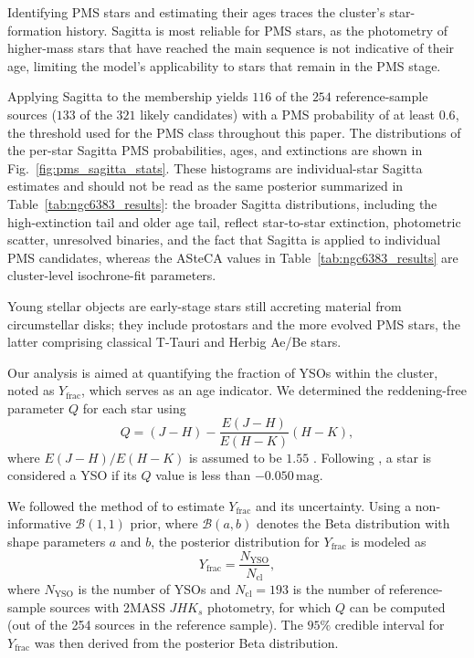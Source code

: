 \documentclass{aa}
\begin{document}
Identifying PMS stars and estimating their ages traces the cluster's star-formation history. Sagitta is most reliable for PMS stars, as the photometry of higher-mass stars that have reached the main sequence is not indicative of their age, limiting the model's applicability to stars that remain in the PMS stage.

Applying Sagitta to the membership yields $116$ of the $254$ reference-sample sources ($133$ of the $321$ likely candidates) with a PMS probability of at least $0.6$, the threshold used for the PMS class throughout this paper. The distributions of the per-star Sagitta PMS probabilities, ages, and extinctions are shown in Fig.~\ref{fig:pms_sagitta_stats}. These histograms are individual-star Sagitta estimates and should not be read as the same posterior summarized in Table~\ref{tab:ngc6383_results}: the broader Sagitta distributions, including the high-extinction tail and older age tail, reflect star-to-star extinction, photometric scatter, unresolved binaries, and the fact that Sagitta is applied to individual PMS candidates, whereas the ASteCA values in Table~\ref{tab:ngc6383_results} are cluster-level isochrone-fit parameters.


Young stellar objects are early-stage stars still accreting material from circumstellar disks; they include protostars and the more evolved PMS stars, the latter comprising classical T-Tauri and Herbig Ae/Be stars.

Our analysis is aimed at quantifying the fraction of YSOs within the cluster, noted as $ Y_{\text{frac}} $, which serves as an age indicator. We determined the reddening-free parameter $ Q $ for each star using
\begin{equation}
	Q = (J - H) - \frac{E(J-H)}{E(H - K)} (H-K),
\end{equation}
where $ E(J-H)/E(H-K) $ is assumed to be $1.55$ \citep{1990ARA&A..28...37M}. Following \citet{2013MNRAS.436.1465B}, a star is considered a YSO if its $ Q $ value is less than $-0.050\,\mathrm{mag}$.

We followed the method of \citet{2011PASA...28..128C} to estimate $ Y_{\text{frac}} $ and its uncertainty. Using a non-informative $\mathcal{B}(1, 1)$ prior, where $\mathcal{B}(a,b)$ denotes the Beta distribution with shape parameters $a$ and $b$, the posterior distribution for $ Y_{\text{frac}} $ is modeled as
\begin{equation}
	Y_{\text{frac}} = \frac{N_{\text{YSO}}}{N_{\text{cl}}},
\end{equation}
where $ N_{\text{YSO}} $ is the number of YSOs and $ N_{\text{cl}}=193 $ is the number of reference-sample sources with 2MASS $JHK_s$ photometry, for which $Q$ can be computed (out of the 254 sources in the reference sample). The $95\%$ credible interval for $ Y_{\text{frac}} $ was then derived from the posterior Beta distribution.
\end{document}
